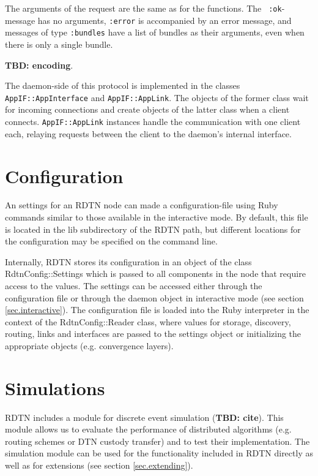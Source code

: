 \documentclass{article}
\begin{document}
The arguments of the request are the same as for the functions. The {\tt
:ok}-message has no arguments, {\tt :error} is accompanied by an error message,
and messages of type {\tt :bundles} have a list of bundles as their arguments,
even when there is only a single bundle.

{\bf TBD: encoding}.

The daemon-side of this protocol is implemented in the classes {\tt
AppIF::AppInterface} and {\tt AppIF::AppLink}. The objects of the former class
wait for incoming connections and create objects of the latter class when a
client connects. {\tt AppIF::AppLink} instances handle the communication with
one client each, relaying requests between the client to the daemon's internal
interface.

\section{Configuration}\label{sec.config}

An settings for an RDTN node can made a configuration-file using Ruby commands
similar to those available in the interactive mode. By default, this file is
located in the lib subdirectory of the RDTN path, but different locations for
the configuration may be specified on the command line.

Internally, RDTN stores its configuration in an object of the class
RdtnConfig::Settings which is passed to all components in the node that require
access to the values. The settings can be accessed either through the
configuration file or through the daemon object in interactive mode (see section
\ref{sec.interactive}). The configuration file is loaded into the Ruby
interpreter in the context of the RdtnConfig::Reader class, where values for
storage, discovery, routing, links and interfaces are passed to the settings
object or initializing the appropriate objects (e.g. convergence layers).

\section{Simulations}\label{sec.sim}

RDTN includes a module for discrete event simulation ({\bf TBD: cite}). This
module allows us to evaluate the performance of distributed algorithms (e.g.
routing schemes or DTN custody transfer) and to test their implementation. The
simulation module can be used for the functionality included in RDTN
directly as well as for extensions (see section \ref{sec.extending}).
\end{document}
